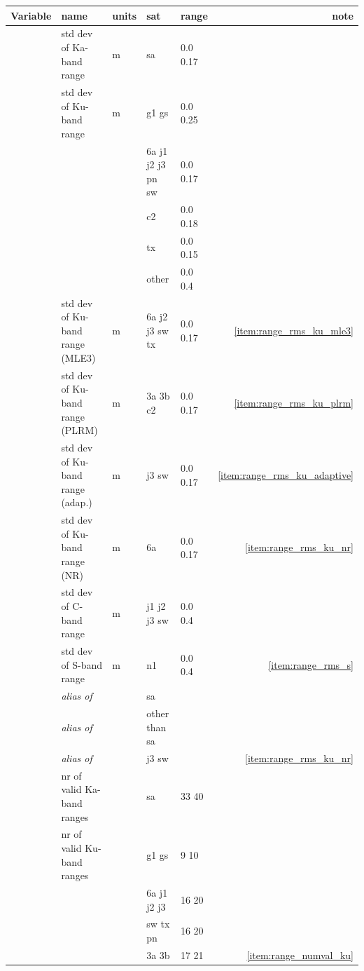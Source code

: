 \documentclass[a4paper,11pt,openany,natbib,nomargin]{thesis}
\newcommand\alias[1]{\emph{alias of} \var{#1}}
\newenvironment{vartable}{
\begin{table}[ht]
\small
\begin{tabular}{lllllr}
\hline\hline
Variable & name & units & sat & range & note \\
\hline\hline
}{
\hline
\end{tabular}
\end{table}
}
\begin{document}
\begin{vartable}
\var{range_rms_ka} & std dev of Ka-band range & m & sa & 0.0 0.17 & \\
\var{range_rms_ku} & std dev of Ku-band range & m & g1 gs & 0.0 0.25 & \\
                   &                          &   & 6a j1 j2 j3 pn sw & 0.0 0.17 & \\
                   &                          &   & c2 & 0.0 0.18 & \\
                   &                          &   & tx & 0.0 0.15 & \\
                   &                          &   & other & 0.0 0.4 & \\
\var{range_rms_ku_mle3} & std dev of Ku-band range (MLE3) & m & 6a j2 j3 sw tx & 0.0 0.17 & \ref{item:range_rms_ku_mle3} \\
\var{range_rms_ku_plrm} & std dev of Ku-band range (PLRM) & m & 3a 3b c2 & 0.0 0.17 & \ref{item:range_rms_ku_plrm} \\
\var{range_rms_ku_adaptive} & std dev of Ku-band range (adap.) & m & j3 sw & 0.0 0.17 & \ref{item:range_rms_ku_adaptive} \\
\var{range_rms_ku_nr} & std dev of Ku-band range (NR) & m & 6a & 0.0 0.17 & \ref{item:range_rms_ku_nr} \\
\var{range_rms_c}  & std dev of C-band range  & m & j1 j2 j3 sw & 0.0 0.4 & \\
\var{range_rms_s}  & std dev of S-band range  & m & n1 & 0.0 0.4 & \ref{item:range_rms_s} \\
\hline
\var{range_rms}    & \alias{range_rms_ka} && sa && \\
\var{range_rms}    & \alias{range_rms_ku} && other than sa && \\
\var{range_rms_ku_nr} & \alias{range_rms_ku_adaptive} & & j3 sw & & \ref{item:range_rms_ku_nr} \\
\hline
\hline
\var{range_numval_ka} & nr of valid Ka-band ranges && sa & 33 40 & \\
\var{range_numval_ku} & nr of valid Ku-band ranges && g1 gs & 9 10 & \\
                      &                                  && 6a j1 j2 j3 & 16 20 & \\
                      &                                  && sw tx pn & 16 20 & \\
                      &                                  && 3a 3b & 17 21 & \ref{item:range_numval_ku} \\

\end{vartable}
\end{document}
